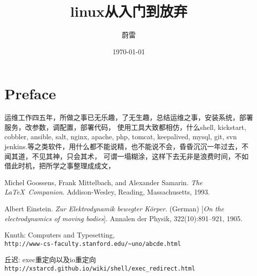 \documentclass[11pt,a4paper]{book}
\title{linux从入门到放弃}
\author{蔚雷}
\date{\today}
\begin{document}
\maketitle

\tableofcontents 

\mainmatter

\chapter*{Preface}

运维工作四五年，所做之事已无乐趣，了无生趣，总结运维之事，安装系统，部署服务，改参数，调配置，部署代码，
使用工具大致都相仿，什么shell, kickstart, cobbler, ansible, salt, nginx, apache, php, tomcat, keepalived, mysql, git, svn 
jenkins.等之类软件，用什么都不能说精，也不能说不会，昏昏沉沉一年过去，不闻其道，不见其神，只会其术，
可谓一塌糊涂，这样下去无非是浪费时间，不如借此时机，把所学之事整理成成文，














%

\begin{thebibliography}{9}
Michel Goossens, Frank Mittelbach, and Alexander Samarin. 
\textit{The \LaTeX\ Companion}. 
Addison-Wesley, Reading, Massachusetts, 1993.
 
Albert Einstein. 
\textit{Zur Elektrodynamik bewegter K{\"o}rper}. (German) 
[\textit{On the electrodynamics of moving bodies}]. 
Annalen der Physik, 322(10):891–921, 1905.
 
Knuth: Computers and Typesetting,
\\\texttt{http://www-cs-faculty.stanford.edu/\~{}uno/abcde.html}

	丘迟: exec重定向以及io重定向
	\\\texttt{http://xstarcd.github.io/wiki/shell/exec_redirect.html}

\end{thebibliography}
\end{document}

